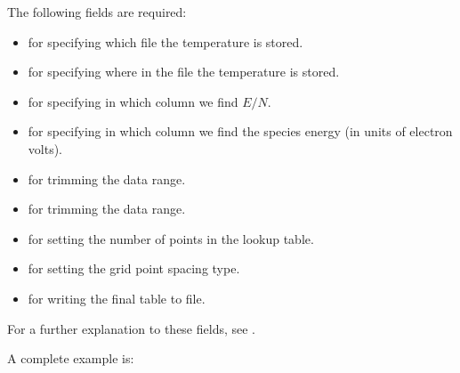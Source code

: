\documentclass[letterpaper,10pt,english]{sphinxmanual}
\begin{document}
The following fields are required:
\begin{itemize}
\item {} 
 for specifying which file the temperature is stored.

\item {} 
 for specifying where in the file the temperature is stored.

\item {} 
 for specifying in which column we find \(E/N\).

\item {} 
 for specifying in which column we find the species energy (in units of electron volts).

\item {} 
 for trimming the data range.

\item {} 
 for trimming the data range.

\item {} 
 for setting the number of points in the lookup table.

\item {} 
 for setting the grid point spacing type.

\item {} 
 for writing the final table to file.

\end{itemize}

For a further explanation to these fields, see {\hyperref[\detokenize{Applications/CdrPlasmaModel:chap-cdrplasmajsonmobility}]{}}.

A complete example is:
\end{document}

